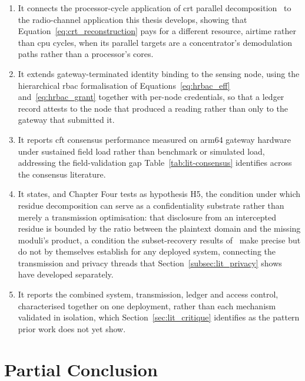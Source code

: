 \documentclass[12pt,a4paper,oneside]{book}
\begin{document}
\begin{enumerate}
  \item It connects the processor-cycle application of \gls{crt} parallel
        decomposition~\cite{beloa2025bitcoincrt} to the radio-channel
        application this thesis develops, showing that
        Equation~\ref{eq:crt_reconstruction} pays for a different resource,
        airtime rather than \gls{cpu} cycles, when its parallel targets are
        a concentrator's demodulation paths rather than a processor's
        cores.
  \item It extends gateway-terminated identity binding to the sensing
        node, using the hierarchical \gls{rbac} formalisation of
        Equations~\ref{eq:hrbac_eff} and~\ref{eq:hrbac_grant}
        \cite{beloasone2025hrbac} together with per-node credentials, so
        that a ledger record attests to the node that produced a reading
        rather than only to the gateway that submitted it.
  \item It reports \gls{cft} consensus performance measured on \gls{arm64}
        gateway hardware under sustained field load rather than benchmark
        or simulated load, addressing the field-validation gap
        Table~\ref{tab:lit-consensus} identifies across the consensus
        literature.
  \item It states, and Chapter Four tests as hypothesis H5, the condition
        under which residue decomposition can serve as a confidentiality
        substrate rather than merely a transmission optimisation: that
        disclosure from an intercepted residue is bounded by the ratio
        between the plaintext domain and the missing moduli's product, a
        condition the subset-recovery results
        of~\cite{goldreich1999china,shoup2009computational} make precise
        but do not by themselves establish for any deployed system,
        connecting the transmission and privacy threads that
        Section~\ref{subsec:lit_privacy} shows have developed
        separately.
  \item It reports the combined system, transmission, ledger and access
        control, characterised together on one deployment, rather than
        each mechanism validated in isolation, which
        Section~\ref{sec:lit_critique} identifies as the pattern prior
        work does not yet show.
\end{enumerate}

\section{Partial Conclusion}
\label{sec:lit_partial_conclusion}
\end{document}
